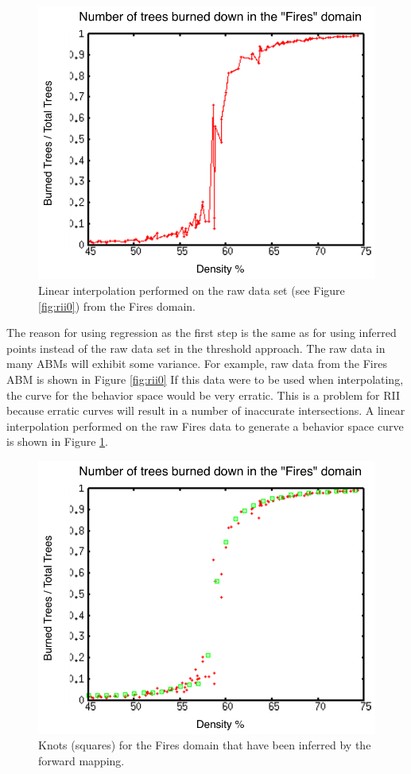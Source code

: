 \begin{figure}[ht]
\centering
\includegraphics[scale=.66666667]{images/rii1.pdf}
\caption{Linear interpolation performed on the raw data set (see Figure \ref{fig:rii0}) from the Fires domain.}
\label{fig:rii1}
\end{figure}

The reason for using regression as the first step is the same as for using inferred points instead of the raw data set in the threshold approach.
The raw data in many ABMs will exhibit some variance.
For example, raw data from the Fires ABM is shown in Figure \ref{fig:rii0}
If this data were to be used when interpolating, the curve for the behavior space would be very erratic.
This is a problem for RII because erratic curves will result in a number of inaccurate intersections.
A linear interpolation performed on the raw Fires data to generate a behavior space curve is shown in Figure \ref{fig:rii1}.

\begin{figure}[ht]
\centering
\includegraphics[scale=.66666667]{images/rii2.pdf}
\caption{Knots (squares) for the Fires domain that have been inferred by the forward mapping.}
\label{fig:rii2}
\end{figure}


